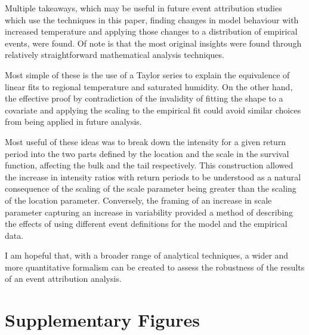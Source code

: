 \documentclass[12pt,a4paper,openany]{report}
\begin{document}
Multiple takeaways,
    which may be useful in future event attribution studies
    which use the techniques in this paper,
    finding changes in model behaviour with increased temperature
    and applying those changes to a distribution of empirical events,
    were found.
Of note is that the most original insights were found through relatively straightforward mathematical analysis techniques.

Most simple of these is the use of a Taylor series to explain
    the equivalence of linear fits to regional temperature and saturated humidity.
On the other hand,
    the effective proof by contradiction of the invalidity of fitting the shape to a covariate and applying the
    scaling to the empirical fit could avoid similar choices from being applied in future analysis.

Most useful of these ideas was to break down the intensity for a given return period
    into the two parts defined by the location and the scale in the survival function,
    affecting the bulk and the tail respectively.
This construction allowed the increase in intensity ratios with return periods to be understood as
    a natural consequence of the scaling of the scale parameter being greater than the
    scaling of the location parameter.
Conversely,
    the framing of an increase in scale parameter capturing an increase in variability
    provided a method of describing the effects of using different event definitions for the model and the empirical data.

I am hopeful that,
    with a broader range of analytical techniques,
    a wider and more quantitative formalism can be created to assess the robustness
    of the results of an event attribution analysis.

\appendix


\chapter{Supplementary Figures}\label{ch:supp}
\end{document}
